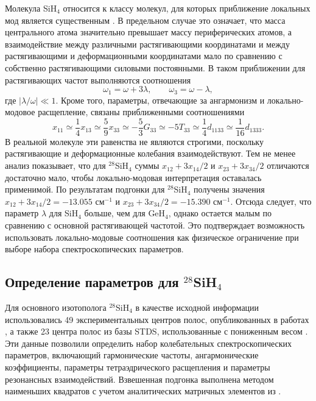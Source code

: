 Молекула SiH$_4$ относится к классу молекул, для которых приближение локальных мод является
существенным \cite{301,302,303,304,305}. В предельном случае это означает, что масса центрального атома
значительно превышает массу периферических атомов, а взаимодействие между различными растягивающими
координатами и между растягивающими и деформационными координатами мало по сравнению с собственно
растягивающими силовыми постоянными. В таком приближении для растягивающих частот выполняются
соотношения
\begin{equation}
\omega_1 = \omega + 3\lambda, \qquad \omega_3 = \omega - \lambda,
\label{eq:si_local_frequencies}
\end{equation}
где $|\lambda/\omega|\ll 1$. Кроме того, параметры, отвечающие за ангармонизм и локально-модовое
расщепление, связаны приближенными соотношениями
\begin{equation}
x_{11} \simeq \frac{1}{4}x_{13} \simeq \frac{5}{9}x_{33} \simeq
-\frac{5}{3}G_{33} \simeq -5T_{33} \simeq \frac{1}{4}d_{1133} \simeq
\frac{1}{16}d_{1333}.
\label{eq:si_local_parameters}
\end{equation}
В реальной молекуле эти равенства не являются строгими, поскольку растягивающие и деформационные
колебания взаимодействуют. Тем не менее анализ показывает, что для ${}^{28}$SiH$_4$ суммы
$x_{12}+3x_{14}/2$ и $x_{23}+3x_{34}/2$ отличаются достаточно мало, чтобы локально-модовая интерпретация
оставалась применимой. По результатам подгонки для ${}^{28}$SiH$_4$ получены значения
$x_{12}+3x_{14}/2=-13.055$ см$^{-1}$ и $x_{23}+3x_{34}/2=-15.390$ см$^{-1}$. Отсюда следует, что параметр
$\lambda$ для SiH$_4$ больше, чем для GeH$_4$, однако остается малым по сравнению с основной
растягивающей частотой. Это подтверждает возможность использовать локально-модовые соотношения как
физическое ограничение при выборе набора спектроскопических параметров.

\subsection{Определение параметров для ${}^{28}$SiH$_4$}

Для основного изотополога ${}^{28}$SiH$_4$ в качестве исходной информации использовались 49
экспериментальных центров полос, опубликованных в работах \cite{4302,4301,4303,4300,5312,4312,zhu1,zhu2,zhu3},
а также 23 центра полос из базы STDS, использованные с пониженным весом \cite{dijon}. Эти данные
позволили определить набор колебательных спектроскопических параметров, включающий гармонические
частоты, ангармонические коэффициенты, параметры тетраэдрического расщепления и параметры
резонансных взаимодействий. Взвешенная подгонка выполнена методом наименьших квадратов с учетом
аналитических матричных элементов из \cite{ulen1,ulen2}.

